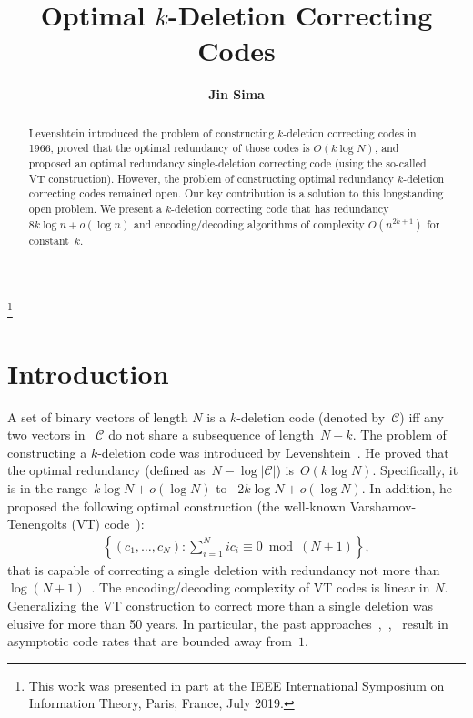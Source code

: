 \documentclass[10pt,a4paper,onecolumn]{IEEEtran}
\newcommand{\1}{\mathbbold{1}}
\newcommand\blfootnote[1]{%
  \begingroup
  \renewcommand\thefootnote{}\footnote{#1}%
  \addtocounter{footnote}{-1}%
  \endgroup
}
\begin{document}
\title{Optimal $k$-Deletion Correcting Codes}
\author{\textbf{Jin Sima} \\
	}

\maketitle

\begin{abstract}
Levenshtein introduced the problem of constructing $k$-deletion correcting codes  in 1966, proved that the optimal redundancy of those codes is $O(k\log N)$, and proposed an optimal redundancy single-deletion correcting code (using the so-called VT construction). However, the problem of constructing optimal redundancy $k$-deletion correcting codes remained open. Our key contribution is a solution to this longstanding open problem. We present a $k$-deletion correcting code that has redundancy $8k\log n +o(\log n)$ and encoding/decoding algorithms of complexity $O(n^{2k+1})$ for constant~$k$.
\end{abstract}
\blfootnote{This work was presented in part at the IEEE International Symposium on Information Theory, Paris, France, July 2019. }
\section{Introduction}
A set of binary vectors of length $N$ is a $k$-deletion code (denoted by~$\mathcal{C}$) iff any two vectors in ~$\mathcal{C}$ do not share a subsequence of length~$N-k$. The problem of constructing a $k$-deletion code was introduced by Levenshtein~\cite{levenshtein1966binary}. He proved that the optimal redundancy (defined as~$N- \log |\mathcal{C}|$) is~$O(k\log N)$. Specifically, it is in the range~$k\log N +o(\log N)$ to ~$2k\log N +o(\log N)$. In addition, he proposed the following optimal construction (the well-known Varshamov-Tenengolts (VT) code~\cite{vt1965}):
\begin{align}\label{equation:VTconstruction}
\left\{(c_1,\ldots,c_N): \sum^N_{i=1}ic_i\equiv 0 \bmod (N+1)\right\},
\end{align}
that is capable of correcting a single deletion with redundancy not more than~$\log (N+1)$~\cite{levenshtein1966binary}. The encoding/decoding complexity of VT codes is linear in $N$. Generalizing the VT construction to correct more than a single deletion was elusive for more than 50 years. In particular, the past approaches~\cite{helberg2002multiple},~\cite{abdel2012helberg},~\cite{paluncic2012multiple} result in asymptotic code rates that are bounded away from~$1$. 
\end{document}
